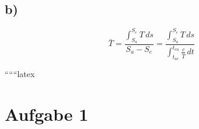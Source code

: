 

\subsection*{b)}

\[
\bar{T} = \frac{\int_{S_a}^{S_e} T \, ds}{S_a - S_e} = \frac{\int_{S_a}^{S_e} T \, ds}{\int_{t_{ac}}^{t_{en}} \frac{c}{\dot{T}} \, dt}
\]

``````latex


\section*{Aufgabe 1}
